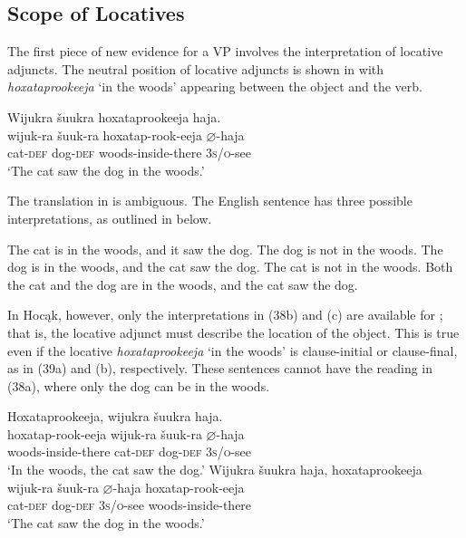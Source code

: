 \documentclass[output=paper]{LSP/langsci}
\begin{document}
\subsection{Scope of Locatives}

The first piece of new evidence for a VP involves the interpretation of locative adjuncts. The neutral position of locative adjuncts is shown in  with \textit{hoxataprookeeja} `in the woods' appearing between the object and the verb.

\begin{exe}
\ex\label{ex:jrs:37} 
\glll Wijukra	\v{s}uukra		hoxataprookeeja		haja.\\
wijuk-ra	\v{s}uuk-ra		hoxatap-rook-eeja		$\varnothing$-haja \\
cat-\textsc{def}		dog-\textsc{def} 	woods-inside-there	\textsc{3s/o}-see \\
\trans `The cat saw the dog in the woods.' 
\end{exe}

The translation in  is ambiguous. The English sentence has three possible interpretations, as outlined in  below.

\begin{exe}
\ex\label{ex:jrs:38} 
\begin{xlist}
\ex The cat is in the woods, and it saw the dog. The dog is not in the woods. 
\ex The dog is in the woods, and the cat saw the dog. The cat is not in the woods.
\ex Both the cat and the dog are in the woods, and the cat saw the dog.
\end{xlist}
\end{exe}

In Hocąk, however, only the interpretations in (38b) and (c) are available for ; that is, the locative adjunct must describe the location of the object. This is true even if the locative \textit{hoxataprookeeja} `in the woods' is clause-initial or clause-final, as in (39a) and (b), respectively. These sentences cannot have the reading in (38a), where only the dog can be in the woods.

\begin{exe}
\ex\label{ex:jrs:39}
\begin{xlist}
\ex 
\glll Hoxataprookeeja, 		wijukra	\v{s}uukra			haja.\\
hoxatap-rook-eeja		wijuk-ra	\v{s}uuk-ra		$\varnothing$-haja \\
	woods-inside-there 	cat-\textsc{def}		dog-\textsc{def}		\textsc{3s/o}-see \\
\trans `In the woods, the cat saw the dog.'
\ex 
\glll Wijukra	\v{s}uukra			haja,				hoxataprookeeja\\
wijuk-ra	\v{s}uuk-ra		$\varnothing$-haja			hoxatap-rook-eeja \\
	cat-\textsc{def}		dog-\textsc{def}		\textsc{3s/o}-see	woods-inside-there \\
\trans `The cat saw the dog in the woods.'
\end{xlist}
\end{exe}
	
\end{document}
